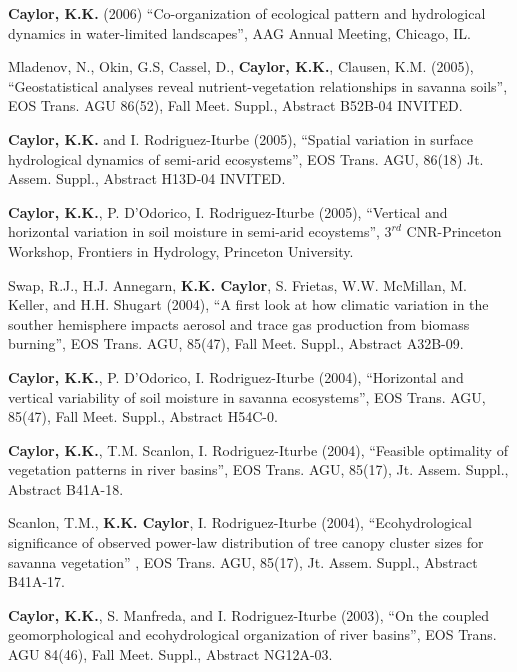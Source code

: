 \documentclass[10pt]{report}
\begin{document}
\begin{etaremune}
\item \textbf{Caylor, K.K.} (2006) ``Co-organization of ecological pattern and hydrological dynamics in water-limited landscapes'', AAG Annual Meeting, Chicago, IL.

\item Mladenov, N., Okin, G.S, Cassel, D., \textbf{Caylor, K.K.}, Clausen, K.M.  (2005), ``Geostatistical analyses reveal nutrient-vegetation relationships in savanna soils'', EOS Trans. AGU 86(52), Fall Meet. Suppl., Abstract B52B-04 INVITED.

\item \textbf{Caylor, K.K.} and I. Rodriguez-Iturbe (2005), ``Spatial variation in surface hydrological dynamics of semi-arid ecosystems'', EOS Trans. AGU, 86(18) Jt. Assem. Suppl., Abstract H13D-04 INVITED.

\item \textbf{Caylor, K.K.}, P. D'Odorico, I. Rodriguez-Iturbe (2005), ``Vertical and horizontal variation in soil moisture in semi-arid ecoystems'', $3^{rd}$ CNR-Princeton Workshop, Frontiers in Hydrology, Princeton University. 

\item Swap, R.J., H.J. Annegarn, \textbf{K.K. Caylor}, S. Frietas, W.W. McMillan, M. Keller, and H.H. Shugart (2004), ``A first look at how climatic variation in the souther hemisphere impacts aerosol and trace gas production from biomass burning'', EOS Trans. AGU, 85(47), Fall Meet. Suppl., Abstract A32B-09.

\item \textbf{Caylor, K.K.}, P. D'Odorico, I. Rodriguez-Iturbe (2004), ``Horizontal and vertical variability of soil moisture in savanna ecosystems'', EOS Trans. AGU, 85(47), Fall Meet. Suppl., Abstract H54C-0.

\item \textbf{Caylor, K.K.}, T.M. Scanlon, I. Rodriguez-Iturbe (2004), ``Feasible optimality of vegetation patterns in river basins'', EOS Trans. AGU, 85(17), Jt. Assem. Suppl., Abstract B41A-18.

\item Scanlon, T.M., \textbf{K.K. Caylor}, I. Rodriguez-Iturbe (2004), ``Ecohydrological significance of observed power-law distribution of tree canopy cluster sizes for savanna vegetation'' , EOS Trans. AGU, 85(17), Jt. Assem. Suppl., Abstract B41A-17.

\item \textbf{Caylor, K.K.}, S. Manfreda, and I. Rodriguez-Iturbe (2003), ``On the coupled geomorphological and ecohydrological organization of river basins'', EOS Trans. AGU 84(46), Fall Meet. Suppl., Abstract NG12A-03.


\end{etaremune}
\end{document}
